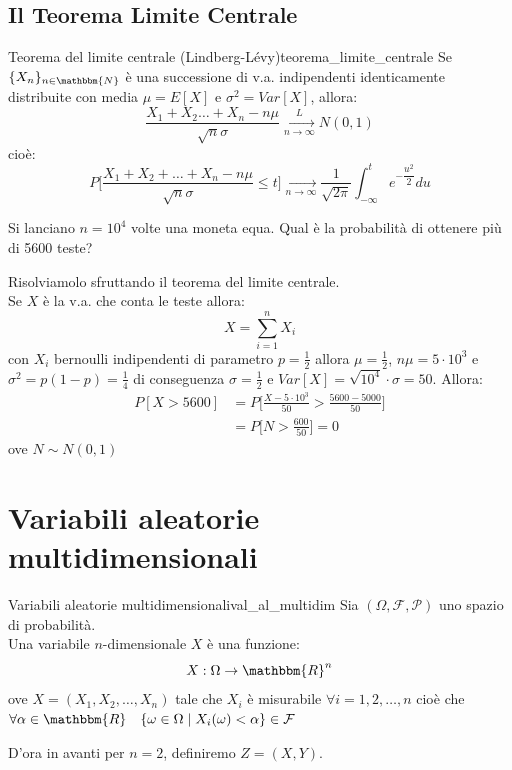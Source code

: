\documentclass[12pt]{report}
\newcounter{theorem}
\newcounter{definition}
\newcounter{exercise}
\newcommand{\nmu}{}
\begin{document}
	 \section{Il Teorema Limite Centrale}
	 \begin{theorem}{\nmu Teorema del limite centrale (Lindberg-Lévy)}{teorema_limite_centrale}
	 	Se $\{X_n\}_{n \in \mathbbm{N}}$ è una successione di v.a. indipendenti identicamente distribuite con media $\mu = E[X]$ e $\sigma^2=Var[X]$, allora:
	 	\[
	 	\dfrac{X_1 + X_2 \dots + X_n - n\mu}{\sqrt{n}\sigma} \underset{n \to \infty}{\overset{L}{\longrightarrow}} N(0, 1)
	 	\]
	 	cioè:
	 	\[
	 	P\Bigg[\dfrac{X_1 + X_2 + \dots + X_n - n\mu}{\sqrt{n}\sigma} \leq t\Bigg] \underset{n \to \infty}{\to} \frac{1}{\sqrt{2\pi}}\int_{-\infty}^{t}e^{-\dfrac{u^2}{2}}du
	 	\]
	 \end{theorem}
	 \begin{exercise}{}{}
	 	\begin{assignment}{}{}
	 		Si lanciano $n=10^4$ volte una moneta equa. Qual è la probabilità di ottenere più di 5600 teste?
	 	\end{assignment}
	 	Risolviamolo sfruttando il teorema del limite centrale. \\
	 	Se $X$ è la v.a. che conta le teste allora:
	 	\[
	 	X = \sum_{i=1}^{n}X_i
	 	\]
	 	con $X_i$ bernoulli indipendenti di parametro $p = \frac{1}{2}$ allora $\mu = \frac{1}{2}$, $n\mu = 5 \cdot 10^3$ e $\sigma^2 = p(1 - p) = \frac{1}{4}$ di conseguenza $\sigma = \frac{1}{2}$ e $Var[X] = \sqrt{10^4} \cdot \sigma = 50$. Allora:
	 	\begin{align*}
	 	P[X > 5600] &= P\Bigg[\frac{X - 5 \cdot 10^3}{50} > \frac{5600 - 5000}{50}\Bigg] \\
	 	&= P\Bigg[N > \frac{600}{50}\Bigg] = 0
	 	\end{align*}
		ove $N \sim N(0, 1)$
	 \end{exercise}
	\chapter{Variabili aleatorie multidimensionali}
	\begin{definition}{\nmu Variabili aleatorie multidimensionali}{val_al_multidim}
		Sia $(\Omega, \mathcal{F}, \mathcal{P})$ uno spazio di probabilità. \\
		Una variabile $n$-dimensionale $X$ è una funzione:
		\[
		X: \Omega \to \mathbbm{R}^n
		\]
		ove $X =(X_1, X_2, \dots, X_n)$ tale che $X_i$ è misurabile $\forall i = 1, 2, \dots, n$ cioè che $\forall \alpha \in \mathbbm{R} \quad \{\omega \in \Omega \mid X_i(\omega) < \alpha\} \in \mathcal{F}$
	\end{definition}
	D'ora in avanti per $n = 2$, definiremo $Z = (X, Y)$. \\
\end{document}
